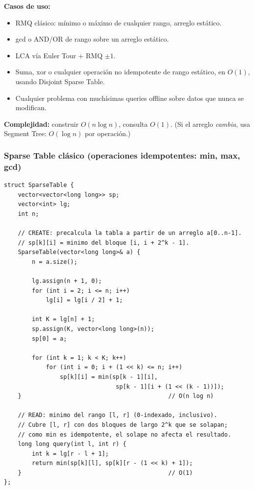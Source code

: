 \documentclass[10pt,a4paper,twocolumn]{article}
\begin{document}
\textbf{Casos de uso:}

\begin{itemize}
    \item RMQ clásico: mínimo o máximo de cualquier rango, arreglo
    estático.
    \item gcd o AND/OR de rango sobre un arreglo estático.
    \item LCA vía Euler Tour + RMQ $\pm1$.
    \item Suma, xor o cualquier operación no idempotente de rango
    estático, en $O(1)$, usando Disjoint Sparse Table.
    \item Cualquier problema con muchísimas queries offline sobre datos
    que nunca se modifican.
\end{itemize}

\textbf{Complejidad:} construir $O(n\log n)$, consulta $O(1)$. (Si el
arreglo \emph{cambia}, usa Segment Tree: $O(\log n)$ por operación.)


\subsubsection{Sparse Table clásico (operaciones idempotentes: min, max, gcd)}

\begin{lstlisting}[style=cpp]
struct SparseTable {
    vector<vector<long long>> sp;
    vector<int> lg;
    int n;

    // CREATE: precalcula la tabla a partir de un arreglo a[0..n-1].
    // sp[k][i] = minimo del bloque [i, i + 2^k - 1].
    SparseTable(vector<long long>& a) {
        n = a.size();

        lg.assign(n + 1, 0);
        for (int i = 2; i <= n; i++)
            lg[i] = lg[i / 2] + 1;

        int K = lg[n] + 1;
        sp.assign(K, vector<long long>(n));
        sp[0] = a;

        for (int k = 1; k < K; k++)
            for (int i = 0; i + (1 << k) <= n; i++)
                sp[k][i] = min(sp[k - 1][i],
                                sp[k - 1][i + (1 << (k - 1))]);
    }                                          // O(n log n)

    // READ: minimo del rango [l, r] (0-indexado, inclusivo).
    // Cubre [l, r] con dos bloques de largo 2^k que se solapan;
    // como min es idempotente, el solape no afecta el resultado.
    long long query(int l, int r) {
        int k = lg[r - l + 1];
        return min(sp[k][l], sp[k][r - (1 << k) + 1]);
    }                                          // O(1)
};
\end{lstlisting}
\end{document}
